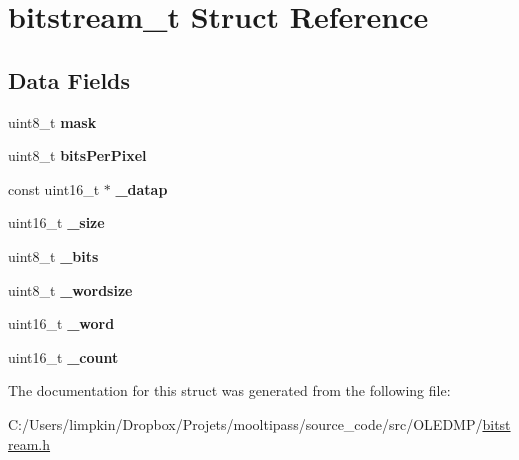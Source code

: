 \hypertarget{structbitstream__t}{\section{bitstream\-\_\-t Struct Reference}
\label{structbitstream__t}
}
\subsection*{Data Fields}
\begin{DoxyCompactItemize}
\item 
\hypertarget{structbitstream__t_a8a74907784be6c7786c2d060c8d7e10b}{uint8\-\_\-t {\bfseries mask}}\label{structbitstream__t_a8a74907784be6c7786c2d060c8d7e10b}

\item 
\hypertarget{structbitstream__t_a6a3c851ca52ea8aa201b6753a4585736}{uint8\-\_\-t {\bfseries bits\-Per\-Pixel}}\label{structbitstream__t_a6a3c851ca52ea8aa201b6753a4585736}

\item 
\hypertarget{structbitstream__t_ac6b93613aac5d1f99bb7110cd3225c50}{const uint16\-\_\-t $\ast$ {\bfseries \-\_\-datap}}\label{structbitstream__t_ac6b93613aac5d1f99bb7110cd3225c50}

\item 
\hypertarget{structbitstream__t_aa634b952549ebb0aa1c5f90330b66f76}{uint16\-\_\-t {\bfseries \-\_\-size}}\label{structbitstream__t_aa634b952549ebb0aa1c5f90330b66f76}

\item 
\hypertarget{structbitstream__t_ac7b691cab37efadfad1f6f8739dfe125}{uint8\-\_\-t {\bfseries \-\_\-bits}}\label{structbitstream__t_ac7b691cab37efadfad1f6f8739dfe125}

\item 
\hypertarget{structbitstream__t_a1247e14eec68041248d6d71040b151a2}{uint8\-\_\-t {\bfseries \-\_\-wordsize}}\label{structbitstream__t_a1247e14eec68041248d6d71040b151a2}

\item 
\hypertarget{structbitstream__t_a957c357acebf129016c23a180c55a138}{uint16\-\_\-t {\bfseries \-\_\-word}}\label{structbitstream__t_a957c357acebf129016c23a180c55a138}

\item 
\hypertarget{structbitstream__t_af818e6e9d7218107aa8fcf4e054c5a10}{uint16\-\_\-t {\bfseries \-\_\-count}}\label{structbitstream__t_af818e6e9d7218107aa8fcf4e054c5a10}

\end{DoxyCompactItemize}


The documentation for this struct was generated from the following file\-:\begin{DoxyCompactItemize}
\item 
C\-:/\-Users/limpkin/\-Dropbox/\-Projets/mooltipass/source\-\_\-code/src/\-O\-L\-E\-D\-M\-P/\hyperlink{bitstream_8h}{bitstream.\-h}\end{DoxyCompactItemize}
